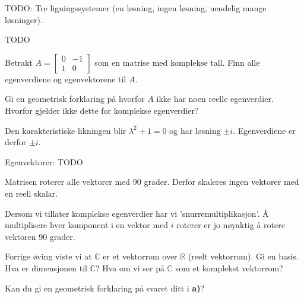 
\begin{oppgave}
TODO: Tre ligningssystemer (en løsning, ingen løsning, uendelig mange løsninger).
\end{oppgave}

\begin{losning}
TODO
\end{losning}

\begin{oppgave}
\begin{punkt}
Betrakt $A=\begin{bmatrix}
0 & -1\\
1 & 0
\end{bmatrix}$ som en matrise med komplekse tall. Finn alle egenverdiene og egenvektorene til $A$.
\end{punkt}

\begin{punkt}
Gi en geometrisk forklaring på hvorfor $A$ ikke har noen reelle egenverdier. Hvorfor gjelder ikke dette for komplekse egenverdier?
\end{punkt}

\end{oppgave}

\begin{losning}

\begin{punkt}
Den karakteristiske likningen blir $\lambda^2+1=0$ og har løsning $\pm i$. Egenverdiene er derfor $\pm i$.

Egenvektorer: TODO

\end{punkt}

\begin{punkt}
Matrisen roterer alle vektorer med 90 grader. Derfor skaleres ingen vektorer med en reell skalar.

\noindent
Dersom vi tillater komplekse egenverdier har vi 'snurremultiplikasjon'. Å multiplisere hver komponent i en vektor med $i$ roterer er jo nøyaktig å rotere vektoren 90 grader.
\end{punkt}
\end{losning}

\begin{oppgave}
\begin{punkt}
Forrige øving viste vi at $\mathbb{C}$ er et vektorrom over $\mathbb{R}$ (reelt vektorrom). Gi en basis. Hva er dimensjonen til $\mathbb{C}$? Hva om vi ser på $\mathbb{C}$ som et komplekst vektorrom?
\end{punkt}
\begin{punkt}
Kan du gi en geometrisk forklaring på svaret ditt i \textbf{a)}?
\end{punkt}
\end{oppgave}

